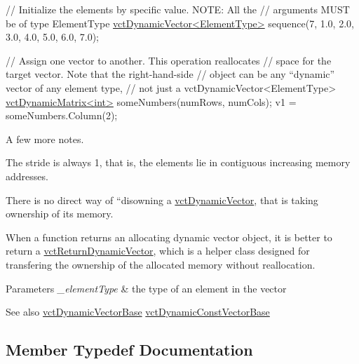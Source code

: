 \begin{DoxyEnumerate}
\begin{DoxyCode}
\textcolor{comment}{// Initialize the elements by specific value.  NOTE: All the}
\textcolor{comment}{// arguments MUST be of type ElementType}
\hyperlink{classvct_dynamic_vector}{vctDynamicVector<ElementType>} sequence(7,
                                       1.0, 2.0, 3.0, 4.0, 5.0, 6.0, 7.0);

\textcolor{comment}{// Assign one vector to another.  This operation reallocates}
\textcolor{comment}{// space for the target vector.  Note that the right-hand-side}
\textcolor{comment}{// object can be any ``dynamic'' vector of any element type,}
\textcolor{comment}{// not just a vctDynamicVector<ElementType>}
\hyperlink{classvct_dynamic_matrix}{vctDynamicMatrix<int>} someNumbers(numRows, numCols);
v1 = someNumbers.Column(2);
\end{DoxyCode}
 
\end{DoxyEnumerate}

A few more notes. 
\begin{DoxyItemize}
\item The stride is always 1, that is, the elements lie in contiguous increasing memory addresses. 
\item There is no direct way of ``disowning\textquotesingle{}\textquotesingle{} a \hyperlink{classvct_dynamic_vector}{vct\+Dynamic\+Vector}, that is taking ownership of its memory. 
\item When a function returns an allocating dynamic vector object, it is better to return a \hyperlink{classvct_return_dynamic_vector}{vct\+Return\+Dynamic\+Vector}, which is a helper class designed for transfering the ownership of the allocated memory without reallocation. 
\end{DoxyItemize}


\begin{DoxyParams}{Parameters}
{\em \+\_\+element\+Type} & the type of an element in the vector\\
\hline
\end{DoxyParams}
\begin{DoxySeeAlso}{See also}
\hyperlink{classvct_dynamic_vector_base}{vct\+Dynamic\+Vector\+Base} \hyperlink{classvct_dynamic_const_vector_base}{vct\+Dynamic\+Const\+Vector\+Base} 
\end{DoxySeeAlso}


\subsection{Member Typedef Documentation}
\hypertarget{classvct_dynamic_vector_aab0ea4a1ec16f7694beb39869ab780bf}{}
